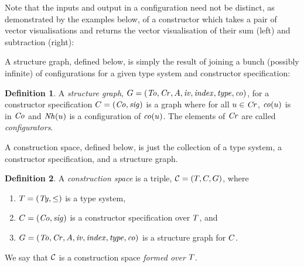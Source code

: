 \documentclass[a4paper]{article}
\theoremstyle{definition}
\newtheorem{definition}{Definition}
\begin{document}
	Note that the inputs and output in a configuration need not be distinct, as demonstrated by the examples below, of a constructor which takes a pair of vector visualisations and returns the vector visualisation of their sum (left) and subtraction (right):
	\begin{center}
		\hspace{3cm}
	\end{center}

	A structure graph, defined below, is simply the result of joining a bunch (possibly infinite) of configurations for a given type system and constructor specification:
	\begin{definition}\label{defn:structureGraph}
		A \textit{structure graph}, $G=(\mathit{To},\mathit{Cr},A,\mathit{iv}, \mathit{index},\mathit{type},\mathit{co})$, for a constructor specification $C=(\mathit{Co}, \mathit{sig})$ is a graph where for all $u\in \mathit{Cr}$, $\mathit{co}(u)$ is in $\mathit{Co}$ and $\mathit{Nh}(u)$ is a configuration of $\mathit{co}(u)$.
		The elements of $\mathit{Cr}$ are called \textit{configurators}.
	\end{definition}

	A construction space, defined below, is just the collection of a type system, a constructor specification, and a structure graph.
	\begin{definition}\label{defn:constructionSpace}
		A \textit{construction space} is a triple, $\mathcal{C}=(T,C, G)$, where %
		\begin{enumerate}[itemsep=0pt,topsep=4pt]
			\item $T=(\mathit{Ty},\leq)$ is a type system,
			\item $C=(\mathit{Co}, \mathit{sig})$ is a constructor specification over $T$, and
			\item $G=(\mathit{To},\mathit{Cr},A,\mathit{iv}, \mathit{index},\mathit{type},\mathit{co})$ is a structure graph for $C$.
		\end{enumerate}
		We say that $\mathcal{C}$ is a construction space \textit{formed over} $T$.
	\end{definition}
\end{document}

